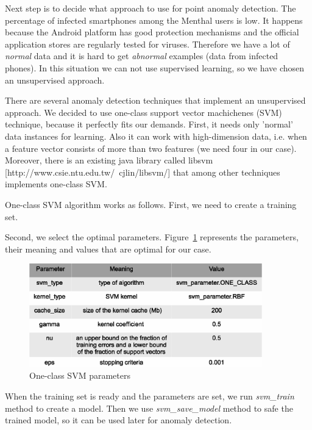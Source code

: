 Next step is to decide what approach to use for point anomaly detection.
The percentage of infected smartphones among the Menthal users is low.
It happens because the Android platform has good protection mechanisms and the official application stores are regularly tested for viruses.
Therefore we have a lot of \textit{normal} data and it is hard to get \textit{abnormal} examples (data from infected phones).
In this situation we can not use supervised learning, so we have chosen an unsupervised approach.

There are several anomaly detection techniques that implement an unsupervised approach.
We decided to use one-class support vector machichenes (SVM) technique, because it perfectly fits our demands.
First, it needs only 'normal' data instances for learning.
Also it can work with high-dimension data, i.e. when a feature vector consists of more than two features (we need four in our case).
Moreover, there is an existing java library called libsvm [http://www.csie.ntu.edu.tw/~cjlin/libsvm/] that among other techniques implements one-class SVM.

One-class SVM algorithm works as follows.
First, we need to create a training set.

Second, we select the optimal parameters.
Figure~\ref{fig:svm_parameters}  represents the parameters, their meaning and values that are optimal for our case.

\begin{figure}[h]
  \centering
  \includegraphics [width=0.9\textwidth]{images/svm_parameters}
  \caption{One-class SVM parameters}
  \label{fig:svm_parameters}
\end{figure}

When the training set is ready and the parameters are set, we run \textit{svm\_train} method to create a model.
Then we use \textit{svm\_save\_model} method to safe the trained model, so it can be used later for anomaly detection.

